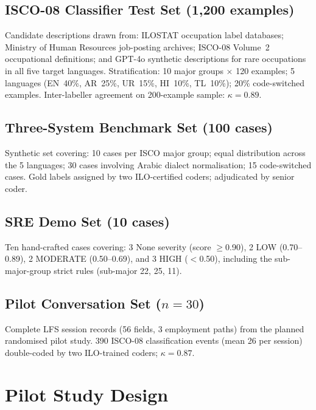 \subsection{ISCO-08 Classifier Test Set (1,200 examples)}

Candidate descriptions drawn from: ILOSTAT occupation label databases;
Ministry of Human Resources job-posting archives; ISCO-08 Volume~2 occupational
definitions; and GPT-4o synthetic descriptions for rare occupations in all five
target languages.
Stratification: 10 major groups $\times$ 120 examples; 5 languages
(EN~40\%, AR~25\%, UR~15\%, HI~10\%, TL~10\%); 20\% code-switched examples.
Inter-labeller agreement on 200-example sample: $\kappa = 0.89$.

\subsection{Three-System Benchmark Set (100 cases)}

Synthetic set covering: 10 cases per ISCO major group; equal distribution
across the 5 languages; 30 cases involving Arabic dialect normalisation;
15 code-switched cases.
Gold labels assigned by two ILO-certified coders; adjudicated by senior coder.

\subsection{SRE Demo Set (10 cases)}

Ten hand-crafted cases covering: 3 None severity (score $\geq$0.90),
2 LOW (0.70--0.89), 2 MODERATE (0.50--0.69), and 3 HIGH ($<$0.50), including
the sub-major-group strict rules (sub-major 22, 25, 11).

\subsection{Pilot Conversation Set ($n = 30$)}

Complete LFS session records (56 fields, 3 employment paths) from the
planned randomised pilot study.
390 ISCO-08 classification events (mean 26 per session) double-coded by two
ILO-trained coders; $\kappa = 0.87$.

\section{Pilot Study Design}
\label{sec:eval-pilot}

